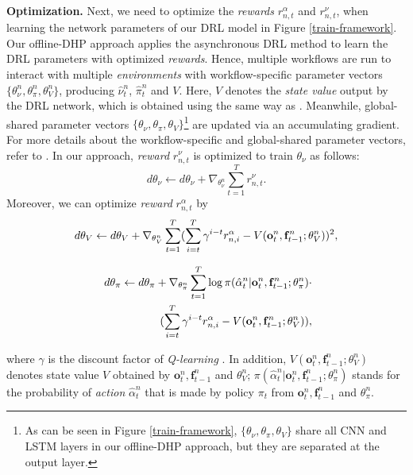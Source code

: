 \documentclass[10pt,journal,compsoc]{IEEEtran}
\begin{document}
\textbf{Optimization.}
Next, we need to optimize the \textit{rewards} $r^{\alpha}_{n,t}$ and $r^{\nu}_{n,t}$, when learning the network parameters of our DRL model in Figure \ref{train-framework}.
Our offline-DHP approach applies the asynchronous DRL method \cite{mnih2016asynchronous} to learn the DRL parameters with optimized \textit{rewards}.
Hence, multiple workflows are run to interact with multiple \textit{environments} with workflow-specific parameter vectors $\{ \theta^{n}_{\nu}, \theta^{n}_{\pi}, \theta^{n}_{V} \}$, producing $\hat{\nu}^n_t$, $\hat{\pi}^n_t$ and $V$.
Here, $V$ denotes the \textit{state value} output by the DRL network, which is obtained using the same way as \cite{mnih2016asynchronous}.
Meanwhile, global-shared parameter vectors $\{ \theta_{\nu}, \theta_{\pi}, \theta_{V} \}$\footnote{As can be seen in Figure \ref{train-framework}, $\{ \theta_{\nu}, \theta_{\pi}, \theta_{V} \}$ share all CNN and LSTM layers in our offline-DHP approach, but they are separated at the output layer.} are updated via an accumulating gradient.
For more details about the workflow-specific and global-shared parameter vectors, refer to \cite{mnih2016asynchronous}.
In our approach, \textit{reward} $r^{\nu}_{n,t}$ is optimized to train $\theta_{\nu}$ as follows:
\begin{equation}
\label{opt-1}
d \theta_{\nu} \leftarrow d \theta_{\nu} + \nabla_{\theta_{\nu}^{n}} \sum_{t=1}^{T} r^{\nu}_{n,t}.
\end{equation}
Moreover, we can optimize \textit{reward} $r^{\alpha}_{n,t}$ by
\begin{equation}
\label{opt-2}
\small d \theta_{V} \leftarrow d \theta_{V} + \nabla_{\theta_{V}^{n}} \sum_{t = 1}^{T} (\sum_{i=t}^{T} \gamma^{i-t} r^{\alpha}_{n,i} - V(\mathbf{o}^n_{t}, \mathbf{f}^n_{t-1} ; \theta_{V}^{n}))^2,
\end{equation}
\begin{small}
\begin{eqnarray}
\label{opt-3}
\hspace{0.1cm} \nonumber d \theta_{\pi} \leftarrow d \theta_{\pi} +\nabla_{\theta_{\pi}^{n}} \sum_{t = 1}^{T} \log \pi( \hat{\alpha}^n_{t} | \mathbf{o}^n_{t}, \mathbf{f}^n_{t-1} ; \theta_{\pi}^{n})\cdot \\
(\sum_{i = t}^{T} \gamma^{i-t} r^{\alpha}_{n,i} - V(\mathbf{o}^n_{t}, \mathbf{f}^n_{t-1} ; \theta_{V}^{n})),
\end{eqnarray}
\end{small}
where $\gamma$ is the discount factor of \textit{Q-learning} \cite{watkins1992q}.
In addition, $V(\mathbf{o}^n_{t}, \mathbf{f}^n_{t-1} ; \theta_{V}^{n})$ denotes state value $V$ obtained by $\mathbf{o}^n_{t}, \mathbf{f}^n_{t-1}$ and $\theta_{V}^{n}$; $\pi( \hat{\alpha}^n_{t} | \mathbf{o}^n_{t}, \mathbf{f}^n_{t-1} ; \theta_{\pi}^{n})$ stands for the probability of \textit{action} $\hat{\alpha}^n_{t}$ that is made by policy $\pi_t$ from $\mathbf{o}^n_{t}, \mathbf{f}^n_{t-1}$ and $\theta_{\pi}^{n}$.
\end{document}
